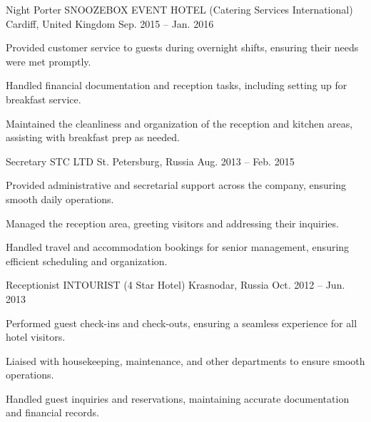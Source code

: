 \begin{cventries}
  \cventry
    {Night Porter} %
    {SNOOZEBOX EVENT HOTEL (Catering Services International)} %
    {Cardiff, United Kingdom} %
    {Sep. 2015 -- Jan. 2016} %
    {
      \begin{cvitems} %
        \item {Provided customer service to guests during overnight shifts, ensuring their needs were met promptly.}
        \item {Handled financial documentation and reception tasks, including setting up for breakfast service.}
        \vfill\null
        \columnbreak
        \item {Maintained the cleanliness and organization of the reception and kitchen areas, assisting with breakfast prep as needed.}
      \end{cvitems}
    }

  \cventry
    {Secretary} %
    {STC LTD} %
    {St. Petersburg, Russia} %
    {Aug. 2013 -- Feb. 2015} %
    {
      \begin{cvitems} %
        \item {Provided administrative and secretarial support across the company, ensuring smooth daily operations.}
        \item {Managed the reception area, greeting visitors and addressing their inquiries.}
        \vfill\null
        \columnbreak
        \item {Handled travel and accommodation bookings for senior management, ensuring efficient scheduling and organization.}
      \end{cvitems}
    }

  \cventry
    {Receptionist} %
    {INTOURIST (4 Star Hotel)} %
    {Krasnodar, Russia} %
    {Oct. 2012 -- Jun. 2013} %
    {
      \begin{cvitems} %
        \item {Performed guest check-ins and check-outs, ensuring a seamless experience for all hotel visitors.}
        \item {Liaised with housekeeping, maintenance, and other departments to ensure smooth operations.}
        \vfill\null
        \columnbreak
        \item {Handled guest inquiries and reservations, maintaining accurate documentation and financial records.}
      \end{cvitems}
    }


\end{cventries}
